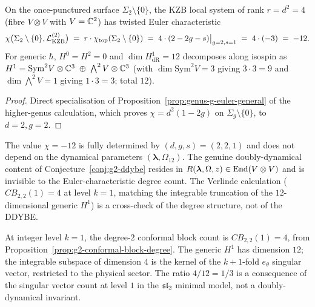 \begin{corollary}[$\chi=-12$ from rank-$4$ KZB local system;
\ClaimStatusProvedHere]
\label{cor:g2-chi-minus-12}
On the once-punctured surface $\Sigma_2\setminus\{0\}$, the
KZB local system of rank $r=d^2=4$ (fibre $V\otimes V$ with
$V=\mathbb{C}^2$) has twisted Euler characteristic
\begin{equation}\label{eq:g2p-euler}
 \chi\bigl(\Sigma_2\setminus\{0\},\mathcal{L}^{(2)}_{\mathrm{KZB}}\bigr)
 \;=\; r\cdot\chi_{\mathrm{top}}(\Sigma_2\setminus\{0\})
 \;=\; 4\cdot(2-2g-s)\big|_{g=2,s=1}
 \;=\; 4\cdot(-3) \;=\; -12.
\end{equation}
For generic $\hbar$, $H^0=H^2=0$ and
$\dim H^1_{\mathrm{dR}}=12$ decomposes along isospin as
$H^1=\mathrm{Sym}^2 V\otimes\mathbb{C}^3\;\oplus\;\bigwedge^2 V\otimes\mathbb{C}^3$
(with $\dim\mathrm{Sym}^2 V=3$ giving $3\cdot 3=9$ and
$\dim\bigwedge^2 V=1$ giving $1\cdot 3=3$; total $12$).
\end{corollary}

\begin{proof}
Direct specialisation of
Proposition~\ref{prop:genus-g-euler-general} of
the higher-genus calculation, which proves
$\chi=d^2(1-2g)$ on $\Sigma_g\setminus\{0\}$, to $d=2, g=2$.
\end{proof}

\begin{remark}[$\chi=-12$ is a topological invariant, not a
doubly-dynamical invariant]
\label{rem:chi-not-dd}
The value $\chi=-12$ is fully determined by
$(d,g,s)=(2,2,1)$ and does not depend on the dynamical
parameters $(\boldsymbol\lambda,\Omega_{12})$. The genuine
doubly-dynamical content of Conjecture~\ref{conj:g2-ddybe} resides in
$R(\boldsymbol\lambda,\Omega,z)\in\mathrm{End}(V\otimes V)$ and
is invisible to the Euler-characteristic degree count. The
Verlinde calculation
($CB_{2,2}(1)=4$ at level $k=1$, matching the integrable
truncation of the $12$-dimensional generic $H^1$) is a
cross-check of the degree structure, not of the DDYBE.
\end{remark}

\begin{remark}
\label{rem:integrable-truncation}
At integer level $k=1$, the degree-$2$ conformal block
count is $CB_{2,2}(1)=4$, from
Proposition~\ref{prop:g2-conformal-block-degree}. The
generic $H^1$ has dimension $12$; the integrable subspace
of dimension $4$ is the kernel of the $k+1$-fold $e_\theta$
singular vector, restricted to the physical sector.
The ratio $4/12 = 1/3$ is a consequence of the singular
vector count at level $1$ in the $\mathfrak{sl}_2$ minimal model,
not a doubly-dynamical invariant.
\end{remark}

